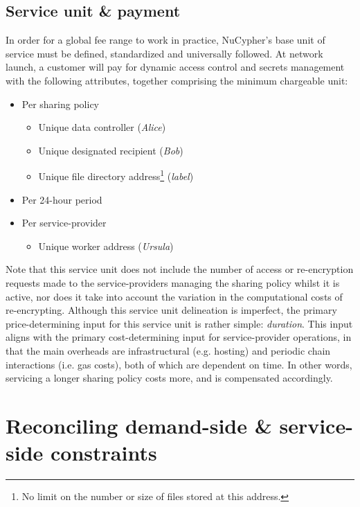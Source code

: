 \documentclass[longbibliography,nofootinbib]{revtex4-1}
\begin{document}
\subsection{Service unit \& payment} \label{su}

In order for a global fee range to work in practice, NuCypher’s base unit of service must be defined, standardized and universally followed. At network launch, a customer will pay for dynamic access control and secrets management with the following attributes, together comprising the minimum chargeable unit: 
\begin{itemize}
    \item Per sharing policy
    \begin{itemize}
        \item Unique data controller (\textit{Alice})
        \item Unique designated recipient (\textit{Bob})
        \item Unique file directory address\footnote{No limit on the number or size of files stored at this address.} (\textit{label})
    \end{itemize}
    \item Per 24-hour period
    \item Per service-provider
    \begin{itemize}
        \item Unique worker address (\textit{Ursula})
    \end{itemize}
\end{itemize}

Note that this service unit does not include the number of access or re-encryption requests made to the service-providers managing the sharing policy whilst it is active, nor does it take into account the variation in the computational costs of re-encrypting. Although this service unit delineation is imperfect, the primary price-determining input for this service unit is rather simple: \textit{duration}. This input aligns with the primary cost-determining input for service-provider operations, in that the main overheads are infrastructural (e.g. hosting) and periodic chain interactions (i.e. gas costs), both of which are dependent on time. In other words, servicing a longer sharing policy costs more, and is compensated accordingly.

\section{Reconciling demand-side \& service-side constraints} \label{dvss}
\end{document}
